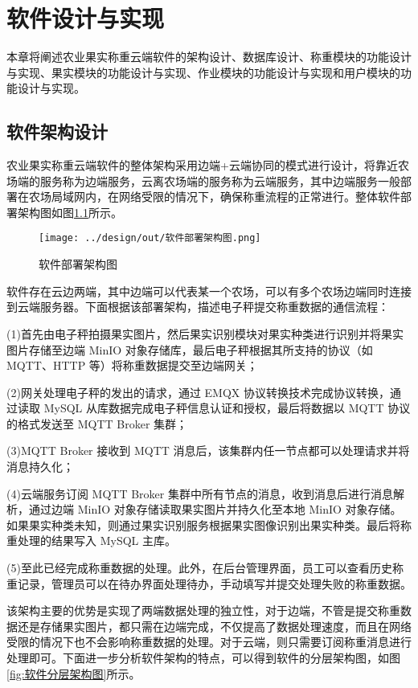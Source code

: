 \chapter{软件设计与实现}

本章将阐述农业果实称重云端软件的架构设计、数据库设计、称重模块的功能设计与实现、果实模块的功能设计与实现、作业模块的功能设计与实现和用户模块的功能设计与实现。

\section{软件架构设计}\label{sec:architecture}

农业果实称重云端软件的整体架构采用边端+云端协同的模式进行设计，将靠近农场端的服务称为边端服务，云离农场端的服务称为云端服务，其中边端服务一般部署在农场局域网内，在网络受限的情况下，确保称重流程的正常进行。整体软件部署架构图如图\ref{fig:软件部署架构图}所示。

\begin{figure}
    \centering
    \texttt{[image: ../design/out/软件部署架构图.png]}
    \caption{软件部署架构图}
    \label{fig:软件部署架构图}
\end{figure}

软件存在云边两端，其中边端可以代表某一个农场，可以有多个农场边端同时连接到云端服务器。下面根据该部署架构，描述电子秤提交称重数据的通信流程：

(1)首先由电子秤拍摄果实图片，然后果实识别模块对果实种类进行识别并将果实图片存储至边端 MinIO 对象存储库，最后电子秤根据其所支持的协议（如 MQTT、HTTP 等）将称重数据提交至边端网关；

(2)网关处理电子秤的发出的请求，通过 EMQX 协议转换技术完成协议转换，通过读取 MySQL 从库数据完成电子秤信息认证和授权，最后将数据以 MQTT 协议的格式发送至 MQTT Broker 集群；

(3)MQTT Broker 接收到 MQTT 消息后，该集群内任一节点都可以处理请求并将消息持久化；

(4)云端服务订阅 MQTT Broker 集群中所有节点的消息，收到消息后进行消息解析，通过边端 MinIO 对象存储读取果实图片并持久化至本地 MinIO 对象存储。如果果实种类未知，则通过果实识别服务根据果实图像识别出果实种类。最后将称重处理的结果写入 MySQL 主库。

(5)至此已经完成称重数据的处理。此外，在后台管理界面，员工可以查看历史称重记录，管理员可以在待办界面处理待办，手动填写并提交处理失败的称重数据。

该架构主要的优势是实现了两端数据处理的独立性，对于边端，不管是提交称重数据还是存储果实图片，都只需在边端完成，不仅提高了数据处理速度，而且在网络受限的情况下也不会影响称重数据的处理。对于云端，则只需要订阅称重消息进行处理即可。下面进一步分析软件架构的特点，可以得到软件的分层架构图，如图\ref{fig:软件分层架构图}所示。

